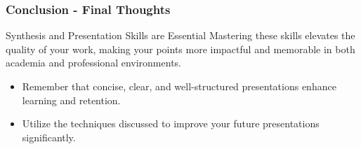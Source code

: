 \documentclass[aspectratio=169]{beamer}
\begin{document}
\begin{frame}[fragile]
    \frametitle{Conclusion - Final Thoughts}
    \begin{block}{Synthesis and Presentation Skills are Essential}
        Mastering these skills elevates the quality of your work, making your points more impactful and memorable in both academia and professional environments.
    \end{block}

    \begin{itemize}
        \item Remember that concise, clear, and well-structured presentations enhance learning and retention.
        \item Utilize the techniques discussed to improve your future presentations significantly.
    \end{itemize}
\end{frame}
\end{document}
